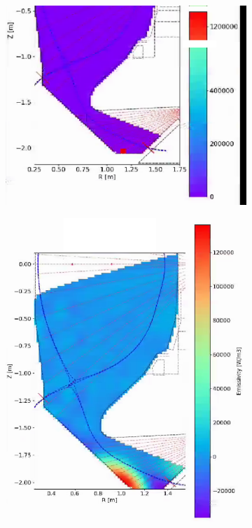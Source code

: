 \begin{figure}[!ht]
     \centering
     \begin{subfigure}{0.45\textwidth}
         \centering
         \includegraphics[trim={0 0 30 0},clip,width=\textwidth]{Chapters/appendix1/figs/phantom_sdx.png}
     \end{subfigure}
     \hfill
     \begin{subfigure}{0.45\textwidth}
         \centering
         \includegraphics[width=\textwidth]{Chapters/appendix1/figs/inversion_sdx.png}
     \end{subfigure}


\end{figure}
